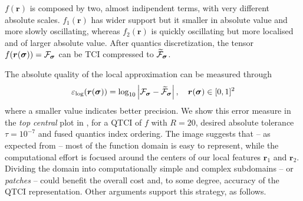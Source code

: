$f(\boldsymbol{r})$ is composed by two, almost indipendent terms, with very different absolute scales. $f_1(\boldsymbol{r})$ has wider support but it smaller in absolute value and more slowly oscillating, whereas $f_2(\boldsymbol{r})$ is quickly oscillating but more localised and of larger absolute value. After quantics discretization, the tensor $f(\boldsymbol{r}(\boldsymbol{\sigma})) = \mathcal{F}_{\boldsymbol{\sigma}}$ can be TCI compressed to $\widetilde{\mathcal{F}}_{\boldsymbol{\sigma}}$. 

The absolute quality of the local approximation can be measured through 
\begin{equation}
	\varepsilon_{\text{log}}(\boldsymbol{r}(\boldsymbol{\sigma})) = \log_{10}\left|\mathcal{F}_{\boldsymbol{\sigma}} - \widetilde{\mathcal{F}}_{\boldsymbol{\sigma}}\right|, \quad \boldsymbol{r}(\boldsymbol{\sigma}) \in [0,1]^2
	\label{eq:logTCIerror}
\end{equation}
where a smaller value indicates better precision. 
We show this error measure in the \textit{top central} plot in , for a QTCI of $f$ with $R=20$, desired absolute tolerance $\tau = 10^{-7}$ and fused quantics index ordering. The image suggests that -- as expected from  -- most of the function domain is easy to represent, while the computational effort is focused around the centers of our local features $\boldsymbol{r}_1$ and $\boldsymbol{r}_2$. Dividing the domain into computationally simple and complex subdomains -- or \textit{patches} -- could benefit the overall cost and, to some degree, accuracy of the QTCI representation. Other arguments support this strategy, as follows. 

